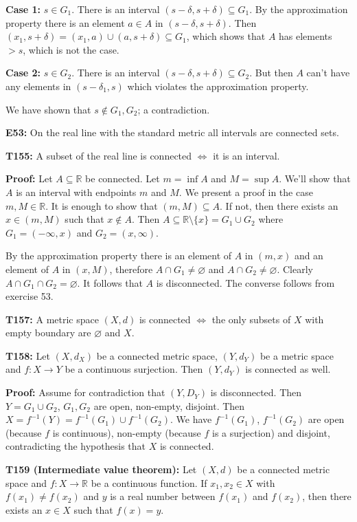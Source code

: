 \documentclass[twocolumn,10pt]{article}
\begin{document}
\textbf{Case 1:} $s\in G_1$. There is an interval $(s-\delta,s+\delta)\subseteq G_1$. By the approximation property there is an element $a\in A$ in $(s-\delta,s+\delta)$. Then $(x_1,s+\delta)=(x_1,a)\cup(a,s+\delta)\subseteq G_1$, which shows that $A$ has elements $>s$, which is not the case.

\textbf{Case 2:} $s\in G_2$. There is an interval $(s-\delta,s+\delta)\subseteq G_2$. But then $A$ can't have any elements in $(s-\delta_1,s)$ which violates the approximation property.

We have shown that $s\not\in G_1,G_2$; a contradiction.
\color{black}

\textbf{E53:} On the real line with the standard metric all intervals are connected sets.

\textbf{T155:} A subset of the real line is connected $\Leftrightarrow$ it is an interval.

\color{red}
\textbf{Proof:} Let $A\subseteq\mathbb{R}$ be connected. Let $m=\inf A$ and $M=\sup A$. We'll show that $A$ is an interval with endpoints $m$ and $M$. We present a proof in the case $m,M\in\mathbb{R}$. It is enough to show that $(m,M)\subseteq A$. If not, then there exists an $x\in(m,M)$ such that $x\not\in A$. Then $A\subseteq\mathbb{R}\setminus\{x\} =G_1\cup G_2$ where $G_1=(-\infty,x)$ and $G_2=(x,\infty)$.

By the approximation property there is an element of $A$ in $(m,x)$ and an element of $A$ in $(x,M)$, therefore $A\cap G_1\neq\varnothing$ and $A\cap G_2\neq\varnothing$. Clearly $A\cap G_1\cap G_2=\varnothing$. It follows that $A$ is disconnected. The converse follows from exercise 53.
\color{black}

\textbf{T157:} A metric space $(X,d)$ is connected $\Leftrightarrow$ the only subsets of $X$ with empty boundary are $\varnothing$ and $X$.

\textbf{T158:} Let $(X,d_X)$ be a connected metric space, $(Y,d_Y)$ be a metric space and $f:X\to Y$ be a continuous surjection. Then $(Y,d_Y)$ is connected as well.

\color{red}
\textbf{Proof:} Assume for contradiction that $(Y,D_Y)$ is disconnected. Then $Y=G_1\cup G_2$, $G_1,G_2$ are open, non-empty, disjoint. Then $X=f^{-1}(Y)=f^{-1}(G_1)\cup f^{-1}(G_2)$. We have $f^{-1}(G_1)$, $f^{-1}(G_2)$ are open (because $f$ is continuous), non-empty (because $f$ is a surjection) and disjoint, contradicting the hypothesis that $X$ is connected.
\color{black}

\textbf{T159 (Intermediate value theorem):} Let $(X,d)$ be a connected metric space and $f:X\to\mathbb{R}$ be a continuous function. If $x_1,x_2\in X$ with $f(x_1)\neq f(x_2)$ and $y$ is a real number between $f(x_1)$ and $f(x_2)$, then there exists an $x\in X$ such that $f(x)=y$.
\end{document}
